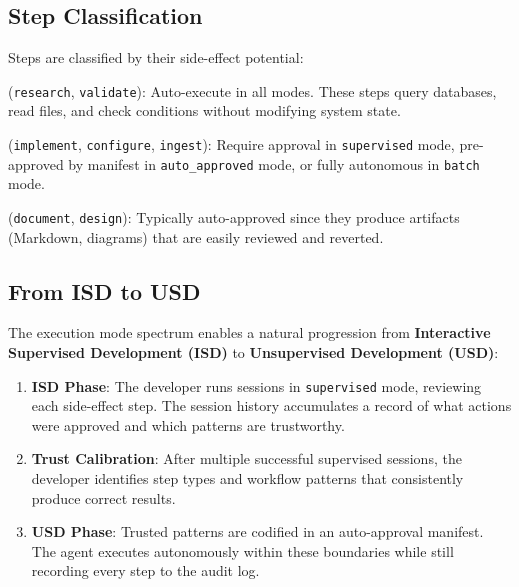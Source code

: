 \documentclass[11pt,letterpaper]{article}
\begin{document}
\subsection{Step Classification}

Steps are classified by their side-effect potential:

\begin{description}[nosep]
    \item[Read-only] (\texttt{research}, \texttt{validate}):
    Auto-execute in all modes.  These steps query databases, read files,
    and check conditions without modifying system state.

    \item[Side-effect] (\texttt{implement}, \texttt{configure},
    \texttt{ingest}):
    Require approval in \texttt{supervised} mode, pre-approved by
    manifest in \texttt{auto\_approved} mode, or fully autonomous in
    \texttt{batch} mode.

    \item[Documentation] (\texttt{document}, \texttt{design}):
    Typically auto-approved since they produce artifacts (Markdown,
    diagrams) that are easily reviewed and reverted.
\end{description}

\subsection{From ISD to USD}

The execution mode spectrum enables a natural progression from
\textbf{Interactive Supervised Development (ISD)} to
\textbf{Unsupervised Development (USD)}:

\begin{enumerate}[nosep]
    \item \textbf{ISD Phase}: The developer runs sessions in
          \texttt{supervised} mode, reviewing each side-effect step.
          The session history accumulates a record of what actions were
          approved and which patterns are trustworthy.
    \item \textbf{Trust Calibration}: After multiple successful supervised
          sessions, the developer identifies step types and workflow
          patterns that consistently produce correct results.
    \item \textbf{USD Phase}: Trusted patterns are codified in an
          auto-approval manifest.  The agent executes autonomously
          within these boundaries while still recording every step to
          the audit log.
\end{enumerate}
\end{document}
